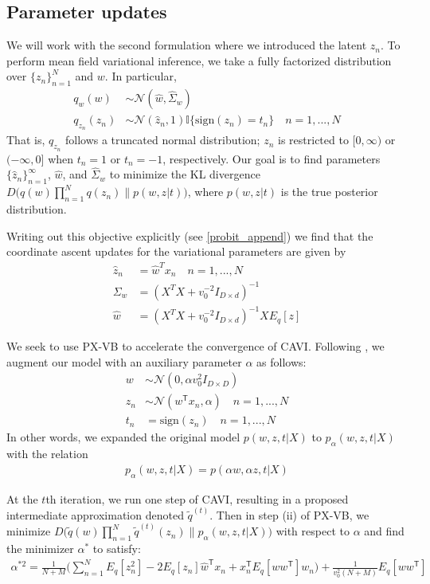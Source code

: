 \documentclass{article}
\begin{document}
\subsection{Parameter updates}
We will work with the second formulation where we introduced the latent $z_n$. To perform mean field variational inference, we take a fully factorized distribution over $\{z_n\}_{n=1}^N$ and $w$. In particular, 
\begin{align}
    q_w(w) &\sim \mathcal N (\hat w, \hat\Sigma_w)\\
    q_{z_n}(z_n) &\sim \mathcal{N}(\hat z_n, 1)\mathbb I\{\text{sign}(z_n) = t_n\} \quad n = 1, ..., N
\end{align}
That is, $q_{z_n}$ follows a truncated normal distribution; $z_n$ is restricted to $[0,\infty)$ or $(-\infty,  0]$ when $t_n=1$ or $t_n=-1$, respectively. Our goal is to find parameters $\{\hat z_n\}_{n=1}^\infty$, $\hat w$, and $\hat\Sigma_w$ to minimize the KL divergence $D\big(q(w) \prod_{n=1}^N q(z_n)\|p(w, z| t)\big)$, where $p(w,z|t)$ is the true posterior distribution. 

Writing out this objective explicitly (see \ref{probit_append}) we find that the coordinate ascent updates for the variational parameters are given by 
\begin{align}
    \hat z_n &= \hat w^T x_n \quad n = 1, ..., N\\
    \Sigma_w &= (X^T X + v_0^{-2} I_{D\times d})^{-1}\\
    \hat w &= (X^T X + v_0^{-2} I_{D\times d})^{-1} XE_q[z]
\end{align}

We seek to use PX-VB to accelerate the convergence of CAVI. Following \cite{Qi}, we augment our model with an auxiliary parameter $\alpha$ as follows: 
\begin{align}
    w &\sim \mathcal N (0, \alpha v_0^2I_{D\times D}) \\
    z_n &\sim \mathcal N (w^\mathsf T x_n, \alpha)\quad n = 1, ..., N \\
    t_n &= \text{sign}(z_n) \quad n = 1, ..., N
\end{align}
In other words, we expanded the original model $p(w,z,t|X)$ to $p_\alpha(w,z,t|X)$ with the relation
\begin{align}
   p_\alpha(w,z,t|X) = p(\alpha w, \alpha z, t|X)
\end{align}

At the $t$th iteration, we run one step of CAVI, resulting in a proposed intermediate approximation denoted $\tilde q^{(t)}$. Then in step (ii) of PX-VB, we minimize $D\big(\tilde q(w) \prod_{n=1}^N \tilde q^{(t)}(z_n) \| p_\alpha(w,z,t|X) \big)$ with respect to $\alpha$ and find the minimizer $\alpha^*$ to satisfy: 
\begin{align}
    \alpha^{*2} = \frac{1}{N+M} \Big(\sum_{n=1}^N E_q[z_n^2] - 2E_q[z_n] \hat w^\mathsf Tx_n + x_n^\mathsf T E_q[w w^\mathsf T] w_n\Big) + \frac{1}{v_0^2(N+M)} E_q[w w^\mathsf T]
\end{align}
\end{document}
